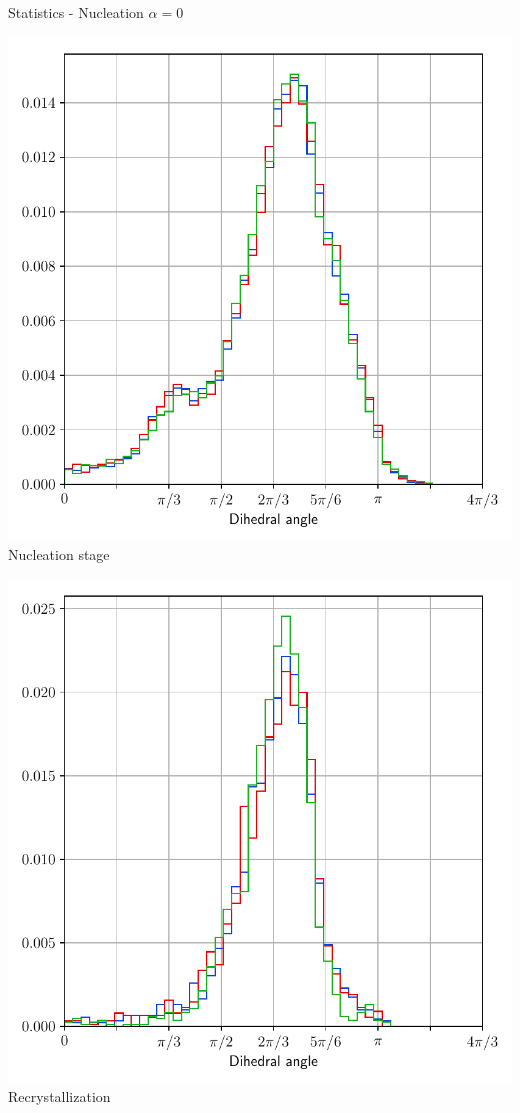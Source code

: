 \documentclass[usenames,dvipsnames]{beamer}
\begin{document}
\begin{frame}{Statistics - Nucleation $\alpha = 0$}
\small
    \begin{minipage}{0.5\textwidth}
    \centering
    \includegraphics[scale=0.35]{figures/stored_energy/SE/dihedral/000110_nuclconstant_set.pdf}\\
    Nucleation stage
    \end{minipage}%
    \begin{minipage}{0.5\textwidth}
    \centering
    \includegraphics[scale=0.35]{figures/stored_energy/SE/dihedral/000240_nuclconstant_set.pdf}\\
    Recrystallization
    \end{minipage}
\end{frame}
\end{document}
